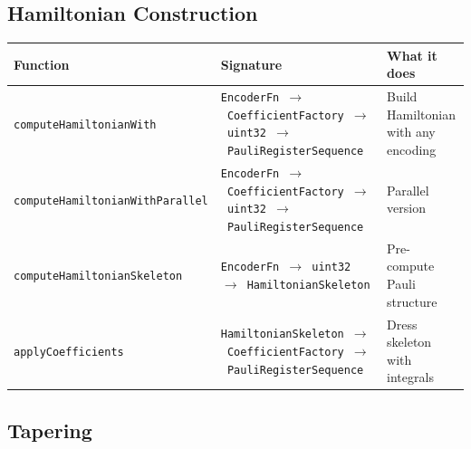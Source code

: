 \documentclass[
  11pt,
  oneside]{book}
\begin{document}
\subsection{Hamiltonian Construction}\label{hamiltonian-construction}

\begin{longtable}[]{@{}
  >{\raggedright\arraybackslash}p{}
  >{\raggedright\arraybackslash}p{}
  >{\raggedright\arraybackslash}p{}@{}}
\toprule\noalign{}
\begin{minipage}[b]{\linewidth}\raggedright
Function
\end{minipage} & \begin{minipage}[b]{\linewidth}\raggedright
Signature
\end{minipage} & \begin{minipage}[b]{\linewidth}\raggedright
What it does
\end{minipage} \\
\midrule\noalign{}
\endhead
\bottomrule\noalign{}
\endlastfoot
\texttt{computeHamiltonianWith} &
\texttt{EncoderFn\ $\rightarrow$\ CoefficientFactory\ $\rightarrow$\ uint32\ $\rightarrow$\ PauliRegisterSequence}
& Build Hamiltonian with any encoding \\
\texttt{computeHamiltonianWithParallel} &
\texttt{EncoderFn\ $\rightarrow$\ CoefficientFactory\ $\rightarrow$\ uint32\ $\rightarrow$\ PauliRegisterSequence}
& Parallel version \\
\texttt{computeHamiltonianSkeleton} &
\texttt{EncoderFn\ $\rightarrow$\ uint32\ $\rightarrow$\ HamiltonianSkeleton} & Pre-compute
Pauli structure \\
\texttt{applyCoefficients} &
\texttt{HamiltonianSkeleton\ $\rightarrow$\ CoefficientFactory\ $\rightarrow$\ PauliRegisterSequence}
& Dress skeleton with integrals \\
\end{longtable}

\subsection{Tapering}\label{tapering}
\end{document}
